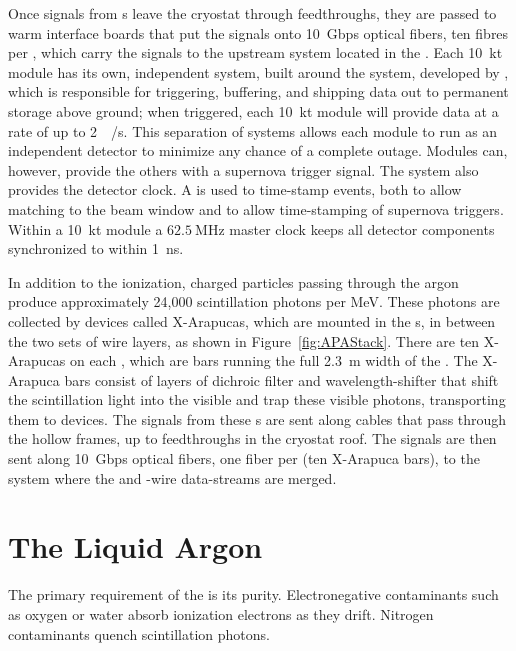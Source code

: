Once signals from s leave the cryostat through feedthroughs, they are passed to warm interface boards that put the signals onto \SI{10}{Gbps} optical fibers, ten fibres per , which carry the signals to the upstream  system located in the . Each \SI{10}{\kilo\tonne} module has its own, independent  system, built around the  system, developed by , which is responsible for triggering, buffering, and shipping data out to permanent storage above ground; when triggered, each \SI{10}{\kilo\tonne} module will provide data at a rate of up to \SI{2}{\tera\byte/\second}. This separation of  systems allows each module to run as an independent detector to minimize any chance of a complete  outage. Modules can, however, provide the others with a supernova trigger signal. The  system also provides the detector clock. A   is used to time-stamp events, both to allow matching to the beam window and to allow time-stamping of supernova triggers. Within a \SI{10}{\kilo\tonne} module a $\SI{62.5}{\mega\hertz}$ master clock keeps all detector components synchronized to within \SI{1}{\nano\second}.

In addition to the ionization, charged particles passing through the argon produce approximately 24,000 scintillation photons per \si{\mega\electronvolt}. These photons are collected by devices called X-Arapucas, which are mounted in the s, in between the two sets of wire layers, as shown in Figure~\ref{fig:APAStack}. There are ten X-Arapucas on each , which are bars running the full \SI{2.3}{\meter} width of the . The X-Arapuca bars consist of layers of dichroic filter and wavelength-shifter that shift the  scintillation light into the visible and trap these visible photons, transporting them to  devices. The signals from these s are sent along cables that pass through the hollow  frames, up to feedthroughs in the cryostat roof. The signals are then sent along \SI{10}{Gbps} optical fibers, one fiber per  (ten X-Arapuca bars), to the  system where the  and -wire data-streams are merged.

\section{The Liquid Argon}
\label{sec:fdsp-exec-liquidargon}

The primary requirement of the  is its purity. Electronegative contaminants such as oxygen or water absorb ionization electrons as they drift. Nitrogen contaminants quench scintillation photons.

